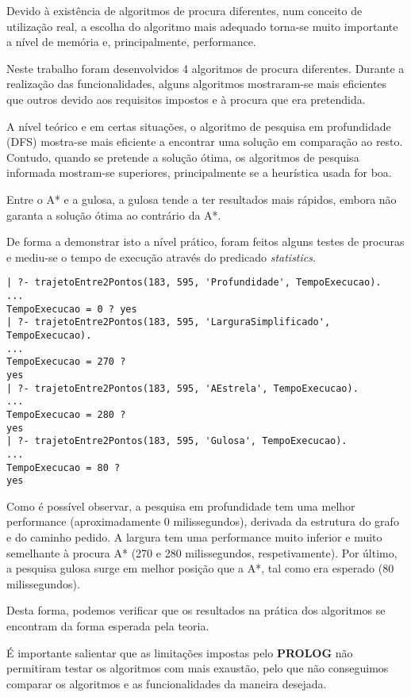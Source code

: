 \documentclass[a4paper,12pt]{report}
\begin{document}
\par Devido à existência de algoritmos de procura diferentes, num conceito de utilização real, a escolha do algoritmo mais adequado torna-se muito importante a nível de memória e, principalmente, performance.
\par Neste trabalho foram desenvolvidos 4 algoritmos de procura diferentes. Durante a realização das funcionalidades, alguns algoritmos mostraram-se mais eficientes que outros devido aos requisitos impostos e à procura que era pretendida.
\par A nível teórico e em certas situações, o algoritmo de pesquisa em profundidade (DFS) mostra-se mais eficiente a encontrar uma solução em comparação ao resto. Contudo, quando se pretende a solução ótima, os algoritmos de pesquisa informada mostram-se superiores, principalmente se a heurística usada for boa. 
\par Entre o A* e a gulosa, a gulosa tende a ter resultados mais rápidos, embora não garanta a solução ótima ao contrário da A*.

\vspace{0.5cm}
\par De forma a demonstrar isto a nível prático, foram feitos alguns testes de procuras e mediu-se o tempo de execução através do predicado \textit{statistics}.

\begin{verbatim}
| ?- trajetoEntre2Pontos(183, 595, 'Profundidade', TempoExecucao). 
...
TempoExecucao = 0 ? yes
| ?- trajetoEntre2Pontos(183, 595, 'LarguraSimplificado', TempoExecucao).
...
TempoExecucao = 270 ? 
yes
| ?- trajetoEntre2Pontos(183, 595, 'AEstrela', TempoExecucao).
...
TempoExecucao = 280 ? 
yes
| ?- trajetoEntre2Pontos(183, 595, 'Gulosa', TempoExecucao).
...
TempoExecucao = 80 ? 
yes
\end{verbatim}  

Como é possível observar, a pesquisa em profundidade tem uma melhor performance (aproximadamente 0 milissegundos), derivada da estrutura do grafo e do caminho pedido. A largura tem uma performance muito inferior e muito semelhante à procura A* (270 e 280 milissegundos, respetivamente). Por último, a pesquisa gulosa surge em melhor posição que a A*, tal como era esperado (80 milissegundos).
\vspace{0.5cm}
\par Desta forma, podemos verificar que os resultados na prática dos algoritmos se encontram da forma esperada pela teoria.
\vspace{0.5cm}
\par É importante salientar que as limitações impostas pelo \textbf{PROLOG} não permitiram testar os algoritmos com mais exaustão, pelo que não conseguimos comparar os algoritmos e as funcionalidades da maneira desejada.
\end{document}
